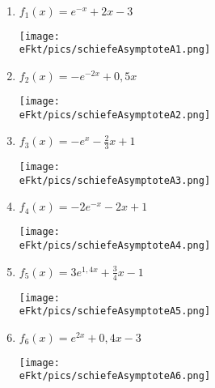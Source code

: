 \begin{Answer}[ref=schAsyA1]\\
	\begin{minipage}{\textwidth}
		\begin{minipage}{0.49\textwidth}
			\begin{enumerate}[label=\alph*)]
				\item \(f_1(x)=e^{-x}+2x-3\)\\\begin{minipage}[t]{0.95\textwidth}
					\texttt{[image: \\eFkt/pics/schiefeAsymptoteA1.png]}
				\end{minipage}
				\item \(f_2(x)=-e^{-2x}+0,5x\)\\\begin{minipage}[t]{0.95\textwidth}
					\texttt{[image: \\eFkt/pics/schiefeAsymptoteA2.png]}
				\end{minipage}
				\item \(f_3(x)=-e^{x}-\frac{2}{3}x+1\)\\\begin{minipage}[t]{0.95\textwidth}
					\texttt{[image: \\eFkt/pics/schiefeAsymptoteA3.png]}
				\end{minipage}
				\item \(f_4(x)=-2e^{-x}-2x+1\)\\\begin{minipage}[t]{0.95\textwidth}
					\texttt{[image: \\eFkt/pics/schiefeAsymptoteA4.png]}
				\end{minipage}
			\end{enumerate}
		\end{minipage}
		\begin{minipage}{0.49\textwidth}
			\begin{enumerate}[label=\alph*)]
				\setcounter{enumi}{4}
				\item \(f_5(x)=3e^{1,4x}+\frac{3}{4}x-1\)\\\begin{minipage}[t]{0.95\textwidth}
					\texttt{[image: \\eFkt/pics/schiefeAsymptoteA5.png]}
				\end{minipage}
				\item \(f_6(x)=e^{2x}+0,4x-3\)\\\begin{minipage}[t]{0.95\textwidth}
					\texttt{[image: \\eFkt/pics/schiefeAsymptoteA6.png]}
				\end{minipage}

\end{enumerate}
\end{minipage}
\end{minipage}
\end{Answer}
